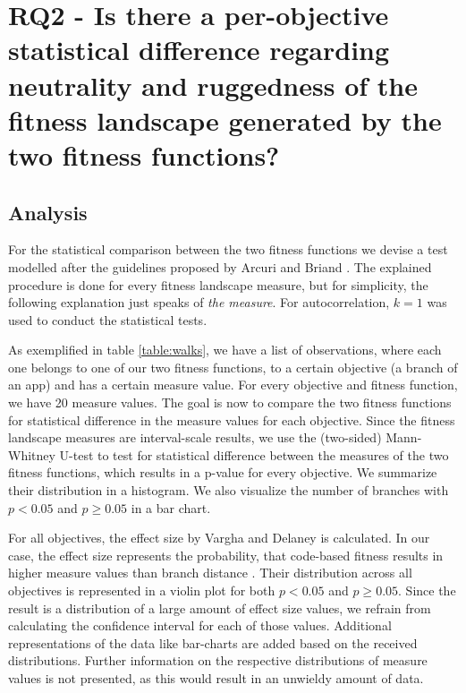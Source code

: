 \section[RQ2]{RQ2 - Is there a per-objective statistical difference regarding neutrality and ruggedness of the fitness landscape generated by the two fitness functions?}

\subsection{Analysis}

For the statistical comparison between the two fitness functions we devise a test modelled after the guidelines proposed by Arcuri and Briand \cite{arcuri2011practical}.
The explained procedure is done for every fitness landscape measure, but for simplicity, the following explanation just speaks of \emph{the measure}.
For autocorrelation, $k=1$ was used to conduct the statistical tests.

As exemplified in table \ref{table:walks}, we have a list of observations, where each one belongs to one of our two fitness functions, to a certain objective (a branch of an app) and has a certain measure value.
For every objective and fitness function, we have 20 measure values.
The goal is now to compare the two fitness functions for statistical difference in the measure values for each objective.
Since the fitness landscape measures are interval-scale results, we use the (two-sided) Mann-Whitney U-test \cite{mann1947test} to test for statistical difference between the measures of the two fitness functions, which results in a p-value for every objective.
We summarize their distribution in a histogram.
We also visualize the number of branches with $p < 0.05$ and $p \geq 0.05$ in a bar chart.

For all objectives, the effect size by Vargha and Delaney \cite{vargha2000critique} is calculated.
In our case, the effect size represents the probability, that code-based fitness results in higher measure values than branch distance \cite{arcuri2011practical}.
Their distribution across all objectives is represented in a violin plot for both $p < 0.05$ and $p \geq 0.05$.
Since the result is a distribution of a large amount of effect size values, we refrain from calculating the confidence interval for each of those values. 
Additional representations of the data like bar-charts are added based on the received distributions.
Further information on the respective distributions of measure values is not presented, as this would result in an unwieldy amount of data.

